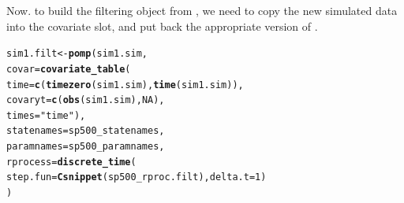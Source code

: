 \documentclass{beamer}\usepackage[]{graphicx}\usepackage[]{color}
\makeatletter
\newcommand{\hlnum}[1]{\textcolor[rgb]{0.686,0.059,0.569}{#1}}%
\newcommand{\hlstr}[1]{\textcolor[rgb]{0.192,0.494,0.8}{#1}}%
\newcommand{\hlstd}[1]{\textcolor[rgb]{0.345,0.345,0.345}{#1}}%
\newcommand{\hlkwb}[1]{\textcolor[rgb]{0.69,0.353,0.396}{#1}}%
\newcommand{\hlkwc}[1]{\textcolor[rgb]{0.333,0.667,0.333}{#1}}%
\newcommand{\hlkwd}[1]{\textcolor[rgb]{0.737,0.353,0.396}{\textbf{#1}}}%
\newenvironment{kframe}{%
 \def\at@end@of@kframe{}%
 \ifinner\ifhmode%
  \def\at@end@of@kframe{\end{minipage}}%
  \begin{minipage}{\columnwidth}%
 \fi\fi%
 \def\FrameCommand##1{\hskip\@totalleftmargin \hskip-\fboxsep
 \colorbox{shadecolor}{##1}\hskip-\fboxsep
     \hskip-\linewidth \hskip-\@totalleftmargin \hskip\columnwidth}%
 \MakeFramed {\advance\hsize-\width
   \@totalleftmargin\z@ \linewidth\hsize
   \@setminipage}}%
 {\par\unskip\endMakeFramed%
 \at@end@of@kframe}
\newenvironment{knitrout}{}{} %
\makeatother
\begin{document}
\begin{frame}[fragile]

\bi

\item Now. to build the filtering object from , we need to copy the new simulated data into the covariate slot, and put back the appropriate version of .


\ei

\begin{knitrout}\small
{}\color{fgcolor}\begin{kframe}
\begin{alltt}
\hlstd{sim1.filt} \hlkwb{<-} \hlkwd{pomp}\hlstd{(sim1.sim,}
  \hlkwc{covar}\hlstd{=}\hlkwd{covariate_table}\hlstd{(}
    \hlkwc{time}\hlstd{=}\hlkwd{c}\hlstd{(}\hlkwd{timezero}\hlstd{(sim1.sim),}\hlkwd{time}\hlstd{(sim1.sim)),}
    \hlkwc{covaryt}\hlstd{=}\hlkwd{c}\hlstd{(}\hlkwd{obs}\hlstd{(sim1.sim),}\hlnum{NA}\hlstd{),}
    \hlkwc{times}\hlstd{=}\hlstr{"time"}\hlstd{),}
  \hlkwc{statenames}\hlstd{=sp500_statenames,}
  \hlkwc{paramnames}\hlstd{=sp500_paramnames,}
  \hlkwc{rprocess}\hlstd{=}\hlkwd{discrete_time}\hlstd{(}
    \hlkwc{step.fun}\hlstd{=}\hlkwd{Csnippet}\hlstd{(sp500_rproc.filt),}\hlkwc{delta.t}\hlstd{=}\hlnum{1}\hlstd{)}
\hlstd{)}
\end{alltt}
\end{kframe}
\end{knitrout}

\end{frame}
\end{document}
